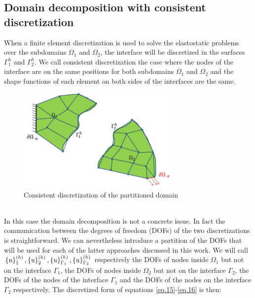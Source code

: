  \subsection{Domain decomposition with consistent discretization}\label{ssec31}
 When a finite element discretization is used to solve the elastostatic problems over the subdomains $\Omega_1$ and $\Omega_2$, the interface will be discretized in the surfaces $\Gamma_1^h$ and $\Gamma_2^h$.  
 We call consistent discretization the case where the nodes of the interface are on the same positions for both subdomains $\Omega_1$ and $\Omega_2$ and the shape functions of each element on both sides of the interfaces are the same.
 \begin{figure}[ht]
 \centering
 \includegraphics[width=8cm]{images/Ch1/Consistent_discretization}
 \caption{Consistent discretization of the partitioned domain} 
 \label{fig.3}
 \end{figure}
 \\
 In this case the domain decomposition is not a concrete issue. In fact the communication between the degrees of freedom (DOFs) of the two discretizations is straightforward. We can nevertheless introduce a partition of the DOFs that will be used for each of the latter approaches discussed in this work.
 We will call $\left\lbrace{u}\right \rbrace_1^{(h)},\left\lbrace{u}\right \rbrace_2^{(h)},\left\lbrace{u}\right \rbrace_{\Gamma_1}^{(h)},\left\lbrace{u}\right \rbrace_{\Gamma_2}^{(h)}$ respectively the DOFs of nodes inside $\Omega_1$ but not on the interface $\Gamma_1$, the DOFs of nodes inside $\Omega_2$ but not on the interface $\Gamma_2$, the DOFs of the nodes of the interface $\Gamma_1$ and the DOFs of the nodes on the interface $\Gamma_2$ respectively. The discretized form of equations \eqref{eq.15}-\eqref{eq.16} is then: 
